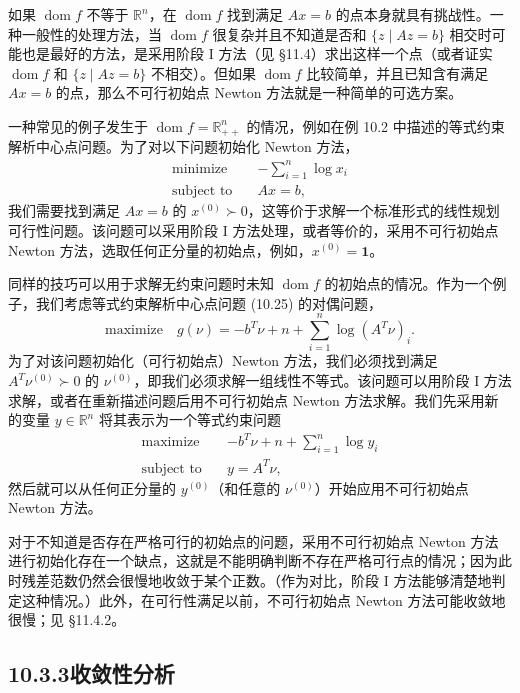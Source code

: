 \documentclass[UTF8, 12pt, fontset=fandol, oneside]{ctexart}
\begin{document}
如果 $\operatorname{dom} f$ 不等于 $\mathbb{R}^n$，在 $\operatorname{dom} f$ 找到满足 $Ax=b$ 的点本身就具有挑战性。一种一般性的处理方法，当 $\operatorname{dom} f$ 很复杂并且不知道是否和 $\{z\mid Az=b\}$ 相交时可能也是最好的方法，是采用阶段 I 方法（见 \S11.4）求出这样一个点（或者证实 $\operatorname{dom} f$ 和 $\{z\mid Az=b\}$ 不相交）。但如果 $\operatorname{dom} f$ 比较简单，并且已知含有满足 $Ax=b$ 的点，那么不可行初始点 Newton 方法就是一种简单的可选方案。

一种常见的例子发生于 $\operatorname{dom} f=\mathbb{R}_{++}^n$ 的情况，例如在例 10.2 中描述的等式约束解析中心点问题。为了对以下问题初始化 Newton 方法，
\begin{equation}
\begin{aligned}
\text{minimize}\quad & -\sum_{i=1}^n\log x_i\\
\text{subject to}\quad & Ax=b,
\end{aligned}
\tag{10.25}
\end{equation}
我们需要找到满足 $Ax=b$ 的 $x^{(0)}\succ 0$，这等价于求解一个标准形式的线性规划可行性问题。该问题可以采用阶段 I 方法处理，或者等价的，采用不可行初始点 Newton 方法，选取任何正分量的初始点，例如，$x^{(0)}=\mathbf{1}$。

同样的技巧可以用于求解无约束问题时未知 $\operatorname{dom} f$ 的初始点的情况。作为一个例子，我们考虑等式约束解析中心点问题 (10.25) 的对偶问题，
\[
\text{maximize}\quad g(\nu)=-b^T\nu+n+\sum_{i=1}^n\log(A^T\nu)_i.
\]
为了对该问题初始化（可行初始点）Newton 方法，我们必须找到满足 $A^T\nu^{(0)}\succ 0$ 的 $\nu^{(0)}$，即我们必须求解一组线性不等式。该问题可以用阶段 I 方法求解，或者在重新描述问题后用不可行初始点 Newton 方法求解。我们先采用新的变量 $y\in\mathbb{R}^n$ 将其表示为一个等式约束问题
\[
\begin{aligned}
\text{maximize}\quad & -b^T\nu+n+\sum_{i=1}^n\log y_i\\
\text{subject to}\quad & y=A^T\nu,
\end{aligned}
\]
然后就可以从任何正分量的 $y^{(0)}$（和任意的 $\nu^{(0)}$）开始应用不可行初始点 Newton 方法。

对于不知道是否存在严格可行的初始点的问题，采用不可行初始点 Newton 方法进行初始化存在一个缺点，这就是不能明确判断不存在严格可行点的情况；因为此时残差范数仍然会很慢地收敛于某个正数。（作为对比，阶段 I 方法能够清楚地判定这种情况。）此外，在可行性满足以前，不可行初始点 Newton 方法可能收敛地很慢；见 \S11.4.2。

\subsection*{10.3.3\quad 收敛性分析}
\end{document}
